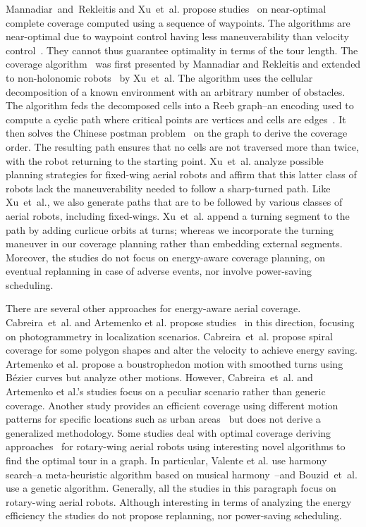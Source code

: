Mannadiar~and~Rekleitis and Xu~et~al. propose studies~\citep{mannadiar2010optimal,xu2011optimal,xu2014efficient} on near-optimal complete coverage computed using a sequence of waypoints. The algorithms are near-optimal due to waypoint control having less maneuverability than velocity control~\citep{xu2014efficient}. They cannot thus guarantee optimality in terms of the tour length. The coverage algorithm~\citep{mannadiar2010optimal} was first presented by Mannadiar and Rekleitis and extended to non-holonomic robots~\citep{xu2011optimal,xu2014efficient} by Xu~et~al. The algorithm uses the cellular decomposition of a known environment with an arbitrary number of obstacles. The algorithm feds the decomposed cells into a Reeb graph--an encoding used to compute a cyclic path where critical points are vertices and cells are edges~\citep{fomenko1997topological}. It then solves the Chinese postman problem~\citep{eiselt2000historical} on the graph to derive the coverage order. The resulting path ensures that no cells are not traversed more than twice, with the robot returning to the starting point. Xu~et~al. analyze possible planning strategies for fixed-wing aerial robots and affirm that this latter class of robots lack the maneuverability needed to follow a sharp-turned path. Like Xu~et~al., we also generate paths that are to be followed by various classes of aerial robots, including fixed-wings. Xu~et~al. append a turning segment to the path by adding curlicue orbits at turns; whereas we incorporate the turning maneuver in our coverage planning rather than embedding external segments. Moreover, the studies do not focus on energy-aware coverage planning, on eventual replanning in case of adverse events, nor involve power-saving scheduling.

There are several other approaches for energy-aware aerial coverage. Cabreira~et~al. and Artemenko et al. propose studies~\citep{cabreira2018energy,artemenko2016energy} in this direction, focusing on photogrammetry in localization scenarios. Cabreira~et~al. propose spiral coverage for some polygon shapes and alter the velocity to achieve energy saving. Artemenko et al. propose a boustrophedon motion with smoothed turns using B\'{e}zier curves but analyze other motions. However, Cabreira~et~al. and Artemenko et al.'s studies focus on a peculiar scenario rather than generic coverage. Another study provides an efficient coverage using different motion patterns for specific locations such as urban areas~\citep{dille2013efficient} but does not derive a generalized methodology. Some studies deal with optimal coverage deriving approaches~\citep{valente2013aerial,bouzid2017quadrotor} for rotary-wing aerial robots using interesting novel algorithms to find the optimal tour in a graph. In particular, Valente et al. use harmony search--a meta-heuristic algorithm based on musical harmony~\citep{geem2009music}--and Bouzid~et~al. use a genetic algorithm. Generally, all the studies in this paragraph focus on rotary-wing aerial robots. Although interesting in terms of analyzing the energy efficiency the studies do not propose replanning, nor power-saving scheduling.

